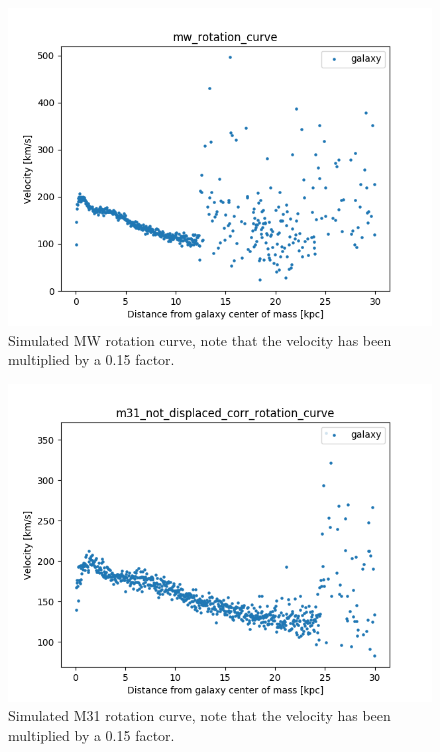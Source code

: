 \documentclass[a4paper,12pt, english]{article}
\begin{document}
\begin{figure}
    \centering
    \includegraphics[width=0.7\linewidth]{VelocityDistr/mw_rotation_curve.png}
    \caption{Simulated MW rotation curve, note that the velocity has been multiplied by a 0.15 factor.}
    \label{fig:mw-rot-curve}
\end{figure}

\begin{figure}
    \centering
    \includegraphics[width=0.7\linewidth]{VelocityDistr/m31_not_displaced_corr_rotation_curve.png}
    \caption{Simulated M31 rotation curve, note that the velocity has been multiplied by a 0.15 factor.}
    \label{fig:m31-rot-curve}
\end{figure}

\end{document}
